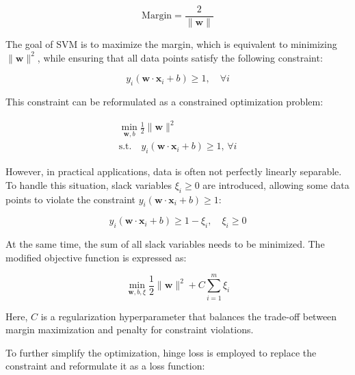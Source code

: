 \documentclass[a4paper, utf8]{ctexart}
\begin{document}
	\vspace{-.75em}
	\begin{equation}
		\text{Margin} = \frac{2}{\|\boldsymbol{w}\|}
	\end{equation}
	
	The goal of SVM is to maximize the margin, which is equivalent to minimizing $\|\boldsymbol{w}\|^2$, while ensuring that all data points satisfy the following constraint:
	
	\vspace{-.75em}
	\begin{equation}
		y_i (\boldsymbol{w} \cdot \boldsymbol{x}_i + b) \geq 1, \quad \forall i
	\end{equation}
	
	This constraint can be reformulated as a constrained optimization problem:
	
	\vspace{-1.25em}
	\begin{gather}
		\min_{\boldsymbol{w}, b} \frac{1}{2} \|\boldsymbol{w}\|^2 \nonumber \\
		\text{s.t.} \quad y_i (\boldsymbol{w} \cdot \boldsymbol{x}_i + b) \geq 1, \, \forall i
	\end{gather}
	
	However, in practical applications, data is often not perfectly linearly separable. To handle this situation, slack variables $\xi_i \geq 0$ are introduced, allowing some data points to violate the constraint $y_i (\boldsymbol{w} \cdot \boldsymbol{x}_i + b) \geq 1$:
	
	\vspace{-.75em}
	\begin{equation}
		y_i (\boldsymbol{w} \cdot \boldsymbol{x}_i + b) \geq 1 - \xi_i, \quad \xi_i \geq 0
	\end{equation}
	
	At the same time, the sum of all slack variables needs to be minimized. The modified objective function is expressed as:
	
	\vspace{-.75em}
	\begin{equation}
		\min_{\boldsymbol{w}, b, \xi} \frac{1}{2} \|\boldsymbol{w}\|^2 + C \sum_{i=1}^m \xi_i
	\end{equation}
	
	Here, $C$ is a regularization hyperparameter that balances the trade-off between margin maximization and penalty for constraint violations.
	
	To further simplify the optimization, hinge loss is employed to replace the constraint and reformulate it as a loss function:
	
\end{document}
